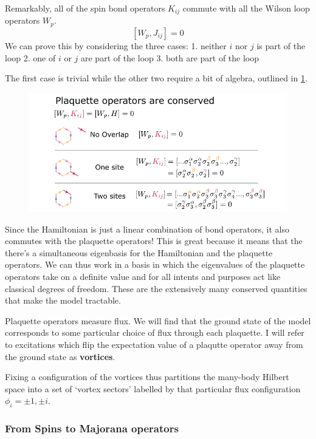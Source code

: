 Remarkably, all of the spin bond operators \(K_{ij}\) commute with all
the Wilson loop operators \(W_p\). \[[W_p, J_{ij}] = 0\] We can prove
this by considering the three cases: 1. neither \(i\) nor \(j\) is part
of the loop 2. one of \(i\) or \(j\) are part of the loop 3. both are
part of the loop

The first case is trivial while the other two require a bit of algebra,
outlined in \cref{fig:visual_kitaev_2}.

\begin{figure}
\hypertarget{fig:visual_kitaev_2}{%
\centering
\includegraphics[width=1.43\textwidth,height=\textheight]{figure_code/amk_chapter/visual_kitaev_2.pdf}
\caption{}\label{fig:visual_kitaev_2}
}
\end{figure}

Since the Hamiltonian is just a linear combination of bond operators, it
also commutes with the plaquette operators! This is great because it
means that the there's a simultaneous eigenbasis for the Hamiltonian and
the plaquette operators. We can thus work in a basis in which the
eigenvalues of the plaquette operators take on a definite value and for
all intents and purposes act like classical degrees of freedom. These
are the extensively many conserved quantities that make the model
tractable.

Plaquette operators measure flux. We will find that the ground state of
the model corresponds to some particular choice of flux through each
plaquette. I will refer to excitations which flip the expectation value
of a plaqutte operator away from the ground state as \textbf{vortices}.

Fixing a configuration of the vortices thus partitions the many-body
Hilbert space into a set of `vortex sectors' labelled by that particular
flux configuration \(\phi_i = \pm 1,\pm i\).

\hypertarget{from-spins-to-majorana-operators}{%
\subsubsection{From Spins to Majorana
operators}\label{from-spins-to-majorana-operators}}

